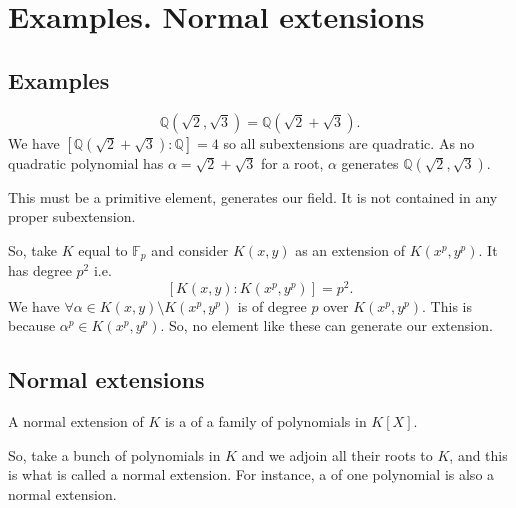 \section{Examples. Normal extensions}

\subsection{Examples}

\begin{example}
  \[
  \mathbb{Q}\left(\sqrt{2}, \sqrt{3}\right) =
  \mathbb{Q}\left(\sqrt{2} + \sqrt{3}\right).
  \]
  We have
  $\left[\mathbb{Q}\left(\sqrt{2} + \sqrt{3}\right) :
    \mathbb{Q}\right] = 4$ so all subextensions are quadratic. As no
  quadratic polynomial has $\alpha = \sqrt{2} + \sqrt{3}$ for a root,
  $\alpha$ generates $\mathbb{Q}\left(\sqrt{2}, \sqrt{3}\right)$.

  This must be a primitive element, generates our field. 
  It is not contained in any proper subextension. 
\end{example}

\begin{example}
  So, take $K$ equal to $\mathbb{F}_p$ and consider
  $K\left(x,y\right)$ as an
  extension of $K\left(x^p,y^p\right)$. It has degree $p^2$ i.e.
  \[
  \left[
    K\left(x,y\right) : K\left(x^p,y^p\right)
    \right] = p^2.
  \]
  We have $\forall \alpha \in K\left(x,y\right) \setminus
  K\left(x^p,y^p\right)$ is of degree $p$ over
  $K\left(x^p,y^p\right)$. This is because
  $\alpha^p \in K\left(x^p,y^p\right)$. So, no element like these can
  generate our extension.  
\end{example}

\subsection{Normal extensions}

\begin{definition}
  A normal extension of $K$ is a  of a
  family of polynomials in $K\left[X\right]$.
  \label{def:normalextension}
\end{definition}

\begin{remark}
  So, take a bunch of polynomials in $K$ and we adjoin all their roots
  to $K$, and this is what is called a normal extension.
  For instance, a  of one polynomial is
  also a normal extension. 
\end{remark}

